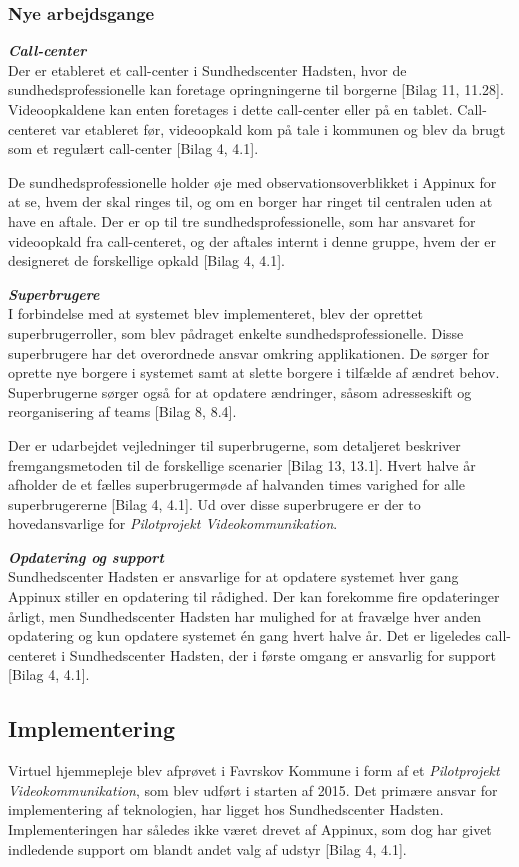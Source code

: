 \subsubsection{Nye arbejdsgange}
\textit{\textbf{Call-center}}\\
Der er etableret et call-center i Sundhedscenter Hadsten, hvor de sundhedsprofessionelle kan foretage opringningerne til borgerne [Bilag 11, 11.28]. Videoopkaldene kan enten foretages i dette call-center eller på en tablet. Call-centeret var etableret før, videoopkald kom på tale i kommunen og blev da brugt som et regulært call-center [Bilag 4, 4.1].

De sundhedsprofessionelle holder øje med observationsoverblikket i Appinux for at se, hvem der skal ringes til, og om en borger har ringet til centralen uden at have en aftale. Der er op til tre sundhedsprofessionelle, som har ansvaret for videoopkald fra call-centeret, og der aftales internt i denne gruppe, hvem der er designeret de forskellige opkald [Bilag 4, 4.1].

\textit{\textbf{Superbrugere}}\\ 
I forbindelse med at systemet blev implementeret, blev der oprettet superbrugerroller, som blev pådraget enkelte sundhedsprofessionelle. Disse superbrugere har det overordnede ansvar omkring applikationen. De sørger for oprette nye borgere i systemet samt at slette borgere i tilfælde af ændret behov. Superbrugerne sørger også for at opdatere ændringer, såsom adresseskift og reorganisering af teams [Bilag 8, 8.4].

Der er udarbejdet vejledninger til superbrugerne, som detaljeret beskriver fremgangsmetoden til de forskellige scenarier [Bilag 13, 13.1]. Hvert halve år afholder de et fælles superbrugermøde af halvanden times varighed for alle superbrugererne [Bilag 4, 4.1]. Ud over disse superbrugere er der to hovedansvarlige for \textit{Pilotprojekt Videokommunikation}.

\textit{\textbf{Opdatering og support}}\\
Sundhedscenter Hadsten er ansvarlige for at opdatere systemet hver gang Appinux stiller en opdatering til rådighed. Der kan forekomme fire opdateringer årligt, men Sundhedscenter Hadsten har mulighed for at fravælge hver anden opdatering og kun opdatere systemet én gang hvert halve år.
Det er ligeledes call-centeret i Sundhedscenter Hadsten, der i første omgang er ansvarlig for support [Bilag 4, 4.1]. 

\subsection{Implementering}
Virtuel hjemmepleje blev afprøvet i Favrskov Kommune i form af et \textit{Pilotprojekt Videokommunikation}, som blev udført i starten af 2015. Det primære ansvar for implementering af teknologien, har ligget hos Sundhedscenter Hadsten. Implementeringen har således ikke været drevet af Appinux, som dog har givet indledende support om blandt andet valg af udstyr [Bilag 4, 4.1].

